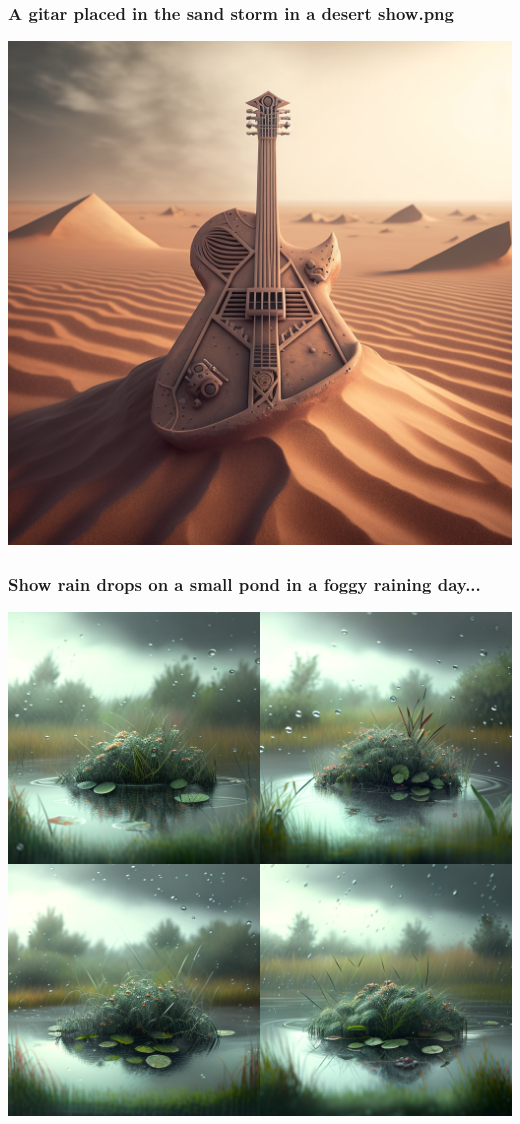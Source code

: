 \documentclass[9pt,table,xcolor=dvipsnames]{beamer}%
\theoremstyle{definition}
\theoremstyle{plain}
\begin{document}
\begin{frame}[fragile,t] %
  \frametitle{A gitar placed in the sand storm in a desert show.png}
  \begin{center}
    \includegraphics[scale=0.22]{./figs/chenle02_A_gitar_placed_in_the_sanddust_storm_in_a_desert_show.png}
  \end{center}
\end{frame}
\begin{frame}[fragile,t] %
  \frametitle{Show rain drops on a small pond in a foggy raining day...}
  \begin{center}
    \includegraphics[scale=0.22]{./figs/chenle02_Show_rain_drops_on_a_small_pond_in_a_foggy_raining_day.png}
  \end{center}
\end{frame}
\end{document}
